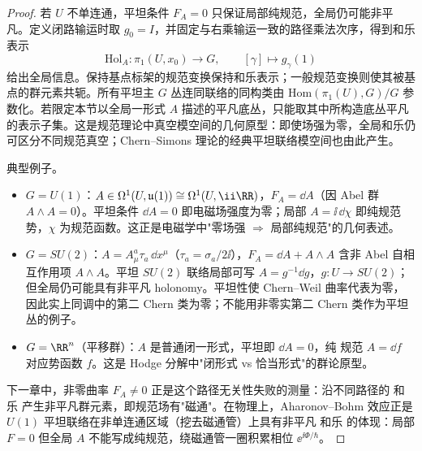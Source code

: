 \begin{proof}
若 $U$ 不单连通，平坦条件 $F_A=0$ 只保证局部纯规范，全局仍可能非平凡。定义闭路输运时取 $g_0=I$，并固定与右乘输运一致的路径乘法次序，得到和乐表示
\begin{equation*}
 \mathrm{Hol}_A:\pi_1(U,x_0)\to G,
 \qquad
 [\gamma]\mapsto g_\gamma(1)
\end{equation*}
给出全局信息。保持基点标架的规范变换保持和乐表示；一般规范变换则使其被基点的群元素共轭。所有平坦主 $G$ 丛连同联络的同构类由 $\mathrm{Hom}(\pi_1(U),G)/G$ 参数化。若限定本节以全局一形式 $A$ 描述的平凡底丛，只能取其中所构造底丛平凡的表示子集。这是规范理论中真空模空间的几何原型：即使场强为零，全局和乐仍可区分不同规范真空；Chern--Simons 理论的经典平坦联络模空间也由此产生。

典型例子。
\begin{itemize}
\item $G=U(1)$：$A\in\Omega^1(U,\mathfrak u(1))\cong\Omega^1(U,\ii\RR)$，$F_A=\dd A$（因 Abel 群 $A\wedge A=0$）。平坦条件 $\dd A=0$ 即电磁场强度为零；局部 $A=\ii\,\dd\chi$ 即纯规范势，$\chi$ 为规范函数。这正是电磁学中"零场强 $\Rightarrow$ 局部纯规范"的几何表述。
\item $G=SU(2)$：$A=A_\mu^a\tau_a\,\dd x^\mu$（$\tau_a=\sigma_a/2\ii$），$F_A=\dd A+A\wedge A$ 含非 Abel 自相互作用项 $A\wedge A$。平坦 $SU(2)$ 联络局部可写 $A=g^{-1}\dd g$，$g:U\to SU(2)$；但全局仍可能具有非平凡 holonomy。平坦性使 Chern--Weil 曲率代表为零，因此实上同调中的第二 Chern 类为零；不能用非零实第二 Chern 类作为平坦丛的例子。
\item $G=\RR^n$（平移群）：$A$ 是普通闭一形式，平坦即 $\dd A=0$，纯 规范 $A=\dd f$ 对应势函数 $f$。这是 Hodge 分解中"闭形式 vs 恰当形式"的群论原型。
\end{itemize}

下一章中，非零曲率 $F_A\neq0$ 正是这个路径无关性失败的测量：沿不同路径的 和乐 产生非平凡群元素，即规范场有"磁通"。在物理上，Aharonov--Bohm 效应正是 $U(1)$ 平坦联络在非单连通区域（挖去磁通管）上具有非平凡 和乐 的体现：局部 $F=0$ 但全局 $A$ 不能写成纯规范，绕磁通管一圈积累相位 $\ee^{\ii\Phi/\hbar}$。
\end{proof}

